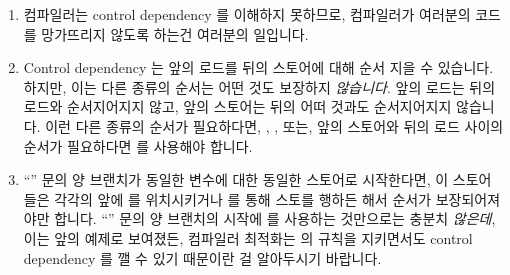 \begin{enumerate}
\item	컴파일러는 control dependency 를 이해하지 못하므로, 컴파일러가 여러분의
	코드를 망가뜨리지 않도록 하는건 여러분의 일입니다.

\item	Control dependency 는 앞의 로드를 뒤의 스토어에 대해 순서 지을 수
	있습니다.
	하지만, 이는 다른 종류의 순서는 어떤 것도 보장하지 \emph{않습니다}.
	앞의 로드는 뒤의 로드와 순서지어지지 않고, 앞의 스토어는 뒤의 어떠
	것과도 순서지어지지 않습니다.
	이런 다른 종류의 순서가 필요하다면, , ,
	또는, 앞의 스토어와 뒤의 로드 사이의 순서가 필요하다면  를
	사용해야 합니다.

\item	``'' 문의 양 브랜치가 동일한 변수에 대한 동일한 스토어로
	시작한다면, 이 스토어들은 각각의 앞에  를 위치시키거나
	 를 통해 스토를 행하든 해서 순서가
	보장되어져야만 합니다.
	``'' 문의 양 브랜치의 시작에  를 사용하는
	것만으로는 충분치 \emph{않은데}, 이는 앞의 예제로 보여졌든, 컴파일러
	최적화는  의 규칙을 지키면서도 control dependency 를 깰
	수 있기 때문이란 걸 알아두시기 바랍니다.

\end{enumerate}

